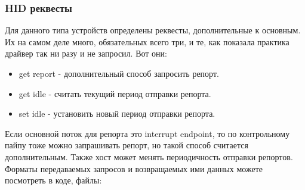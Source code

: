 \documentclass[12pt,a4paper]{article}
\begin{document}
\subsubsection{HID реквесты}\label{2}
    Для данного типа устройств определены реквесты, дополнительные к основным.
    Их на самом деле много, обязательных всего три, и те, как показала практика
    драйвер так ни разу и не запросил. Вот они:
\begin{itemize}
    \item get report - дополнительный способ запросить репорт.
    \item get idle - считать текущий период отправки репорта.
    \item set idle - установить новый период отправки репорта.
\end{itemize}
    Если основной поток для репорта это interrupt endpoint, то по контрольному
    пайпу тоже можно запрашивать репорт, но такой способ считается
    дополнительным. Также хост может менять периодичность отправки репортов.
    Форматы передаваемых запросов и возвращаемых ими данных можете посмотреть
     в коде, файлы:\\
    \\
    \\

\newpage
\end{document}
